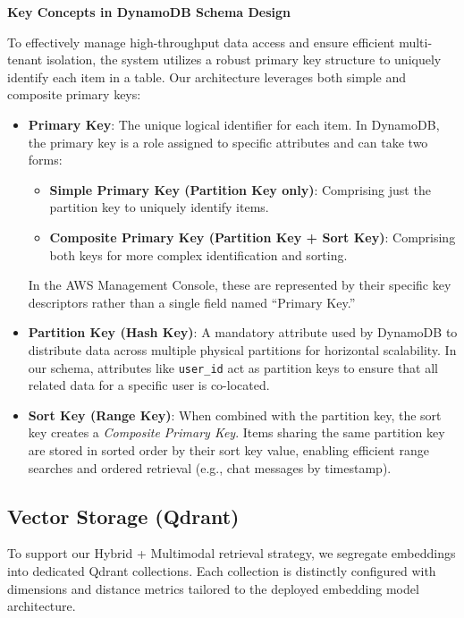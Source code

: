\textbf{Key Concepts in DynamoDB Schema Design}

To effectively manage high-throughput data access and ensure efficient multi-tenant isolation, the system utilizes a robust primary key structure to uniquely identify each item in a table. Our architecture leverages both simple and composite primary keys:
\begin{itemize}
    \item \textbf{Primary Key}: The unique logical identifier for each item. In DynamoDB, the primary key is a role assigned to specific attributes and can take two forms:
    \begin{itemize}
        \item \textbf{Simple Primary Key (Partition Key only)}: Comprising just the partition key to uniquely identify items.
        \item \textbf{Composite Primary Key (Partition Key + Sort Key)}: Comprising both keys for more complex identification and sorting.
    \end{itemize}
    In the AWS Management Console, these are represented by their specific key descriptors rather than a single field named ``Primary Key.''
    \item \textbf{Partition Key (Hash Key)}: A mandatory attribute used by DynamoDB to distribute data across multiple physical partitions for horizontal scalability. In our schema, attributes like \texttt{user\_id} act as partition keys to ensure that all related data for a specific user is co-located.
    \item \textbf{Sort Key (Range Key)}: When combined with the partition key, the sort key creates a \textit{Composite Primary Key}. Items sharing the same partition key are stored in sorted order by their sort key value, enabling efficient range searches and ordered retrieval (e.g., chat messages by timestamp).
\end{itemize}

\subsection{Vector Storage (Qdrant)}
To support our Hybrid + Multimodal retrieval strategy, we segregate embeddings into dedicated Qdrant collections. Each collection is distinctly configured with dimensions and distance metrics tailored to the deployed embedding model architecture.

